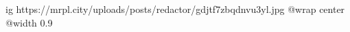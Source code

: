 
 
 
 
 

\ifcmt
  ig https://mrpl.city/uploads/posts/redactor/gdjtf7zbqdnvu3yl.jpg
  @wrap center
  @width 0.9
\fi
